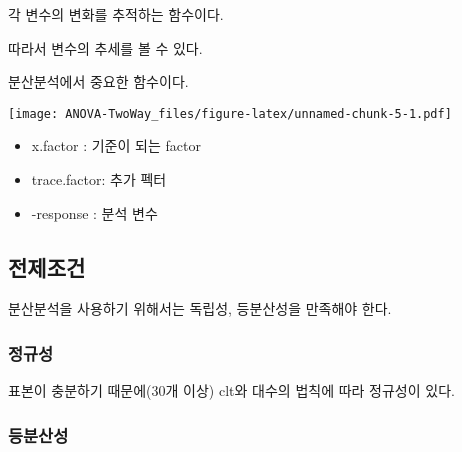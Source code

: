 \documentclass[
]{article}
\newenvironment{Shaded}{\begin{snugshade}}{\end{snugshade}}
\newcommand{\AttributeTok}[1]{\textcolor[rgb]{0.77,0.63,0.00}{#1}}
\newcommand{\ConstantTok}[1]{\textcolor[rgb]{0.00,0.00,0.00}{#1}}
\newcommand{\DecValTok}[1]{\textcolor[rgb]{0.00,0.00,0.81}{#1}}
\newcommand{\FunctionTok}[1]{\textcolor[rgb]{0.00,0.00,0.00}{#1}}
\newcommand{\NormalTok}[1]{#1}
\newcommand{\SpecialCharTok}[1]{\textcolor[rgb]{0.00,0.00,0.00}{#1}}
\newcommand{\StringTok}[1]{\textcolor[rgb]{0.31,0.60,0.02}{#1}}
\providecommand{\tightlist}{%
  \setlength{\itemsep}{0pt}\setlength{\parskip}{0pt}}
\begin{document}
각 변수의 변화를 추적하는 함수이다.

따라서 변수의 추세를 볼 수 있다.

분산분석에서 중요한 함수이다.

\begin{Shaded}
\end{Shaded}

\texttt{[image: ANOVA-TwoWay\_files/figure-latex/unnamed-chunk-5-1.pdf]}

\begin{itemize}
\tightlist
\item
  x.factor : 기준이 되는 factor
\item
  trace.factor: 추가 펙터
\item
  -response : 분석 변수
\end{itemize}

\hypertarget{uxc804uxc81cuxc870uxac74-1}{%
\subsection{전제조건}\label{uxc804uxc81cuxc870uxac74-1}}

분산분석을 사용하기 위해서는 독립성, 등분산성을 만족해야 한다.

\hypertarget{uxc815uxaddcuxc131-1}{%
\subsubsection{정규성}\label{uxc815uxaddcuxc131-1}}

표본이 충분하기 때문에(30개 이상) clt와 대수의 법칙에 따라 정규성이 있다.

\hypertarget{uxb4f1uxbd84uxc0b0uxc131-1}{%
\subsubsection{등분산성}\label{uxb4f1uxbd84uxc0b0uxc131-1}}
\end{document}
